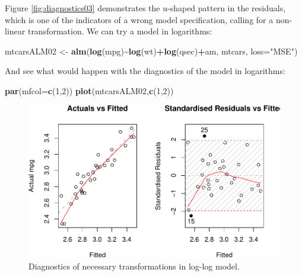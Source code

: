 \documentclass[
]{book}
\newenvironment{Shaded}{\begin{snugshade}}{\end{snugshade}}
\newcommand{\DataTypeTok}[1]{\textcolor[rgb]{0.13,0.29,0.53}{#1}}
\newcommand{\DecValTok}[1]{\textcolor[rgb]{0.00,0.00,0.81}{#1}}
\newcommand{\KeywordTok}[1]{\textcolor[rgb]{0.13,0.29,0.53}{\textbf{#1}}}
\newcommand{\NormalTok}[1]{#1}
\newcommand{\OperatorTok}[1]{\textcolor[rgb]{0.81,0.36,0.00}{\textbf{#1}}}
\newcommand{\StringTok}[1]{\textcolor[rgb]{0.31,0.60,0.02}{#1}}
\theoremstyle{definition}
\theoremstyle{definition}
\theoremstyle{definition}
\theoremstyle{definition}
\theoremstyle{remark}
\begin{document}
Figure \ref{fig:diagnostics03} demonstrates the u-shaped pattern in the residuals, which is one of the indicators of a wrong model specification, calling for a non-linear transformation. We can try a model in logarithms:

\begin{Shaded}
\begin{Highlighting}[]
\NormalTok{mtcarsALM02 \textless{}{-}}\StringTok{ }\KeywordTok{alm}\NormalTok{(}\KeywordTok{log}\NormalTok{(mpg)}\OperatorTok{\textasciitilde{}}\KeywordTok{log}\NormalTok{(wt)}\OperatorTok{+}\KeywordTok{log}\NormalTok{(qsec)}\OperatorTok{+}\NormalTok{am, mtcars, }\DataTypeTok{loss=}\StringTok{"MSE"}\NormalTok{)}
\end{Highlighting}
\end{Shaded}

And see what would happen with the diagnostics of the model in logarithms:

\begin{Shaded}
\begin{Highlighting}[]
\KeywordTok{par}\NormalTok{(}\DataTypeTok{mfcol=}\KeywordTok{c}\NormalTok{(}\DecValTok{1}\NormalTok{,}\DecValTok{2}\NormalTok{))}
\KeywordTok{plot}\NormalTok{(mtcarsALM02,}\KeywordTok{c}\NormalTok{(}\DecValTok{1}\NormalTok{,}\DecValTok{2}\NormalTok{))}
\end{Highlighting}
\end{Shaded}

\begin{figure}
\centering
\includegraphics{Svetunkov---Statistics-for-Business-Analytics_files/figure-latex/diagnostics04-1.pdf}
\caption{\label{fig:diagnostics04}Diagnostics of necessary transformations in log-log model.}
\end{figure}
\end{document}
